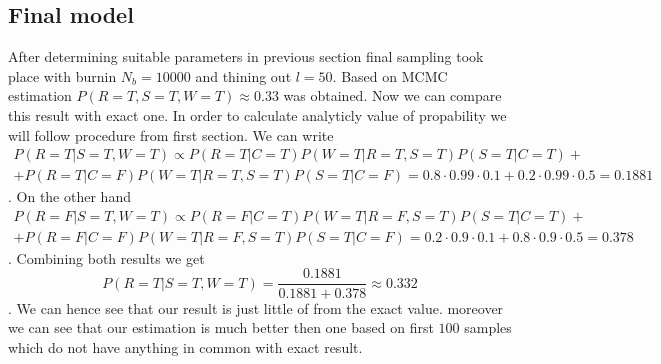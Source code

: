 \documentclass[12pt,a4paper]{article}
\begin{document}
\subsection{Final model}
\hspace{1cm} After determining suitable parameters in previous section final sampling took place with burnin $N_b=10000$ and thining out $l=50$. Based on
MCMC estimation $P(R=T,S=T,W=T)\approx 0.33$ was obtained. Now we can compare this result with exact one. In order to calculate analyticly value of propability 
we will follow procedure from first section. We can write
\begin{align*}
    P(R=T|S=T,W=T)\propto P(R=T|C=T)P(W=T|R=T,S=T)P(S=T|C=T)+\\ +P(R=T|C=F)P(W=T|R=T,S=T)P(S=T|C=F)=0.8\cdot0.99\cdot0.1+0.2\cdot 0.99\cdot0.5=0.1881
\end{align*}
. On the other hand
\begin{align*}
    P(R=F|S=T,W=T)\propto P(R=F|C=T)P(W=T|R=F,S=T)P(S=T|C=T)+\\ +P(R=F|C=F)P(W=T|R=F,S=T)P(S=T|C=F)=0.2\cdot0.9\cdot 0.1+0.8\cdot 0.9\cdot 0.5=0.378
\end{align*}.
Combining both results we get 
\begin{equation*}
    P(R=T|S=T,W=T)=\frac{0.1881}{0.1881+0.378}\approx 0.332
\end{equation*}. We can hence see that our result is just little of from the exact value. moreover we can see that our estimation is much better then one
based on first $100$ samples which do not have anything in common with exact result.
\end{document}
